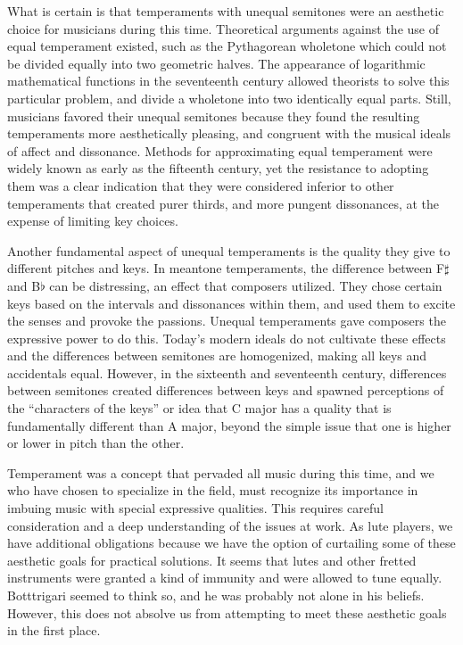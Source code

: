 What is certain is that temperaments with unequal semitones were an aesthetic choice for musicians
during this time. Theoretical arguments against the use of equal temperament existed, such as the
Pythagorean wholetone which could not be divided equally into two geometric halves. The appearance
of logarithmic mathematical functions in the seventeenth century allowed theorists to solve this
particular problem, and divide a wholetone into two identically equal parts.  Still, musicians
favored their unequal semitones because they found the resulting temperaments more aesthetically
pleasing, and congruent with the musical ideals of affect and dissonance. Methods for approximating
equal temperament were widely known as early as the fifteenth century, yet the resistance to
adopting them was a clear indication that they were considered inferior to other temperaments that
created purer thirds, and more pungent dissonances, at the expense of limiting key choices.

Another fundamental aspect of unequal temperaments is the quality they give to different pitches and
keys.  In meantone temperaments, the difference between F$\sharp$ and B$\flat$ can be distressing,
an effect that composers utilized.  They chose certain keys based on the intervals and dissonances
within them, and used them to excite the  senses and provoke the passions. Unequal temperaments
gave composers the expressive power to do this. Today's modern ideals do not cultivate these
effects and the differences between semitones are homogenized, making all keys and accidentals
equal.  However, in the sixteenth and seventeenth century, differences between semitones created
differences between keys and spawned perceptions of the ``characters of the keys'' or idea that C
major has a quality that is fundamentally different than A major, beyond the simple issue
that one is higher or lower in pitch than the other.

Temperament was a concept that pervaded all music during this time, and we who have chosen to 
specialize in the field, must recognize its importance in imbuing music with special expressive
qualities.  This requires careful consideration and a deep understanding of the issues at work.  As lute
players, we have additional obligations because we have the option of curtailing some of these
aesthetic goals for practical solutions.  It seems that lutes and other fretted instruments were
granted a kind of immunity and were allowed to tune equally.  Botttrigari seemed to think so, and he
was probably not alone in his beliefs. \autocite[19]{HB:1}  However, this does not absolve us from
attempting to meet these aesthetic goals in the first place.


